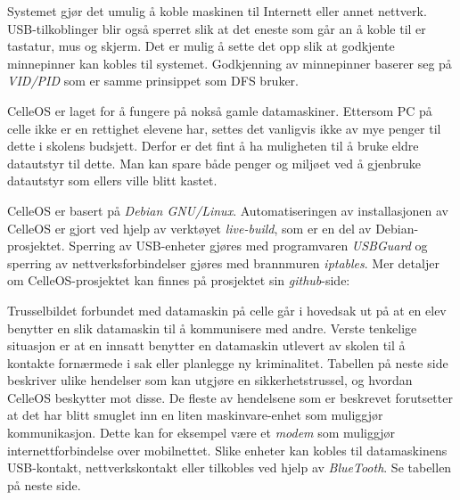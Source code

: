Systemet gj\o r det umulig \aa{} koble maskinen til Internett eller annet nettverk. USB-tilkoblinger blir ogs\aa{} sperret slik at det eneste som g\aa r an \aa{} koble til er tastatur, mus og skjerm. Det er mulig \aa{} sette det opp slik at godkjente minnepinner kan kobles til systemet. Godkjenning av minnepinner baserer seg p\aa{} {\it VID/PID} som er samme prinsippet som DFS bruker.

CelleOS er laget for \aa{} fungere p\aa{} noks\aa{} gamle datamaskiner. Ettersom PC p\aa{} celle ikke er en rettighet elevene har, settes det vanligvis ikke av mye penger til dette i skolens budsjett. Derfor er det fint \aa{} ha muligheten til \aa{} bruke eldre datautstyr til dette. Man kan spare b\aa de penger og milj\o et ved \aa{} gjenbruke datautstyr som ellers ville blitt kastet.


CelleOS er basert p\aa{} {\it Debian GNU/Linux}. Automatiseringen av installasjonen av CelleOS er gjort ved hjelp av verkt\o yet {\it live-build}, som er en del av Debian-prosjektet. Sperring av USB-enheter gj\o res med programvaren {\it USBGuard} og sperring av nettverksforbindelser gj\o res med brannmuren {\it iptables}. Mer detaljer om CelleOS-prosjektet kan finnes p\aa{} prosjektet sin {\it github}-side:
\smallskip
{}


Trusselbildet forbundet med datamaskin p\aa{} celle g\aa r i hovedsak ut p\aa{} at en elev benytter en slik datamaskin til \aa{} kommunisere med andre. Verste tenkelige situasjon er at en innsatt benytter en datamaskin utlevert av skolen til \aa{} kontakte forn\ae rmede i sak eller planlegge ny kriminalitet.
Tabellen p\aa{} neste side beskriver ulike hendelser som kan utgj\o re en sikkerhetstrussel, og hvordan CelleOS beskytter mot disse. De fleste av hendelsene som er beskrevet forutsetter at det har blitt smuglet inn en liten maskinvare-enhet som muliggj\o r kommunikasjon. Dette kan for eksempel v\ae re et {\it modem} som muliggj\o r internettforbindelse over mobilnettet. Slike enheter kan kobles til datamaskinens USB-kontakt, nettverkskontakt eller tilkobles ved hjelp av {\it BlueTooth}. Se tabellen p\aa{} neste side.

\vfill\eject
\topglue 1pc

\def\firstcolwidth{12pc}
\def\secondcolwidth{19pc}
\def\tablerow#1#2{
\vbox{
\btexdraw
\drawdim pc
\textref h:L v:T
\move(0 0) \htext{\vbox{\hsize=\firstcolwidth \noindent\raggedright #1}}
\move(16 0) \htext{\vbox{\hsize=\secondcolwidth \noindent\raggedright #2}}
\etexdraw
}}
\def\tablehline{
\vbox{
\btexdraw
\drawdim pc
\move(0 0) \linewd 0.01 \lvec(35 0)
\etexdraw}
}

